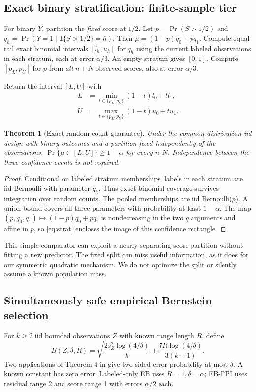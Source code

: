 \documentclass{article}
\newtheorem{theorem}{Theorem}
\newcommand{\ind}{\mathbf{1}}
\begin{document}
\subsection{Exact binary stratification: finite-sample tier}\label{sec:exact}
For binary $Y$, partition the \emph{fixed} score at $1/2$. Let $p=\Pr(S>1/2)$ and $q_h=\Pr(Y=1\mid\ind\{S>1/2\}=h)$. Then $\mu=(1-p)q_0+pq_1$. Compute equal-tail exact binomial intervals $[l_h,u_h]$ for $q_h$ using the current labeled observations in each stratum, each at error $\alpha/3$. An empty stratum gives $[0,1]$. Compute $[p_L,p_U]$ for $p$ from \emph{all} $n+N$ observed scores, also at error $\alpha/3$.

Return the interval $[L,U]$ with
\begin{align}\label{eq:strat}
L&=\min_{t\in\{p_L,p_U\}}(1-t)l_0+tl_1,\\
U&=\max_{t\in\{p_L,p_U\}}(1-t)u_0+tu_1.\nonumber
\end{align}
\begin{theorem}[Exact random-count guarantee]\label{thm:exact}
Under the common-distribution iid design with binary outcomes and a partition fixed independently of the observations, $\Pr\{\mu\in[L,U]\}\geq1-\alpha$ for every $n,N$. Independence between the three confidence events is not required.
\end{theorem}
\begin{proof}
Conditional on labeled stratum memberships, labels in each stratum are iid Bernoulli with parameter $q_h$. Thus exact binomial coverage survives integration over random counts. The pooled memberships are iid Bernoulli($p$). A union bound covers all three parameters with probability at least $1-\alpha$. The map $(p,q_0,q_1)\mapsto(1-p)q_0+pq_1$ is nondecreasing in the two $q$ arguments and affine in $p$, so \cref{eq:strat} encloses the image of this confidence rectangle.
\end{proof}
This simple comparator can exploit a nearly separating score partition without fitting a new predictor. The fixed split can miss useful information, as it does for our symmetric quadratic mechanism. We do not optimize the split or silently assume a known population mass.

\subsection{Simultaneously safe empirical-Bernstein selection}
For $k\geq2$ iid bounded observations $Z$ with known range length $R$, define
\begin{equation}\label{eq:eb}
B(Z,\delta,R)=\sqrt{\frac{2s_Z^2\log(4/\delta)}k}
+\frac{7R\log(4/\delta)}{3(k-1)}.
\end{equation}
Two applications of Theorem 4 in \citet{eb} give two-sided error probability at most $\delta$. A known constant has zero error. Labeled-only EB uses $R=1,\delta=\alpha$; EB-PPI uses residual range 2 and score range 1 with errors $\alpha/2$ each.
\end{document}
